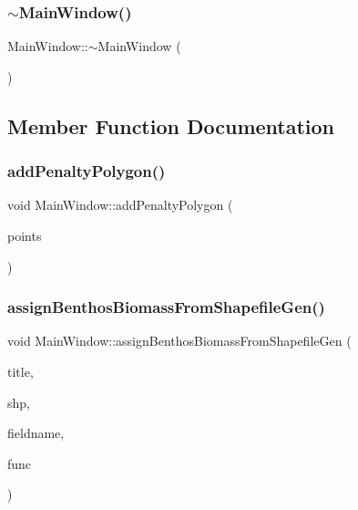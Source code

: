 \subsubsection{\texorpdfstring{$\sim$MainWindow()}{~MainWindow()}\hspace{0.1cm}{\footnotesize\ttfamily [2/2]}}
{\footnotesize\ttfamily Main\+Window\+::$\sim$\+Main\+Window (\begin{DoxyParamCaption}{ }\end{DoxyParamCaption})}



\subsection{Member Function Documentation}
\mbox{\label{class_main_window_a5cbafb7391e6b192655aef23f2443e7e}} 
\subsubsection{\texorpdfstring{addPenaltyPolygon()}{addPenaltyPolygon()}}
{\footnotesize\ttfamily void Main\+Window\+::add\+Penalty\+Polygon (\begin{DoxyParamCaption}\item[{const Q\+List$<$ Q\+PointF $>$ \&}]{points }\end{DoxyParamCaption})}

\mbox{\label{class_main_window_a88de9882d6c755f8dee4c0a2fa61b190}} 
\subsubsection{\texorpdfstring{assignBenthosBiomassFromShapefileGen()}{assignBenthosBiomassFromShapefileGen()}}
{\footnotesize\ttfamily void Main\+Window\+::assign\+Benthos\+Biomass\+From\+Shapefile\+Gen (\begin{DoxyParamCaption}\item[{Q\+String}]{title,  }\item[{Q\+String}]{shp,  }\item[{const char $\ast$const}]{fieldname,  }\item[{std\+::function$<$ void(O\+G\+R\+Geometry $\ast$, int)$>$}]{func }\end{DoxyParamCaption})\hspace{0.3cm}{\ttfamily [protected]}}


